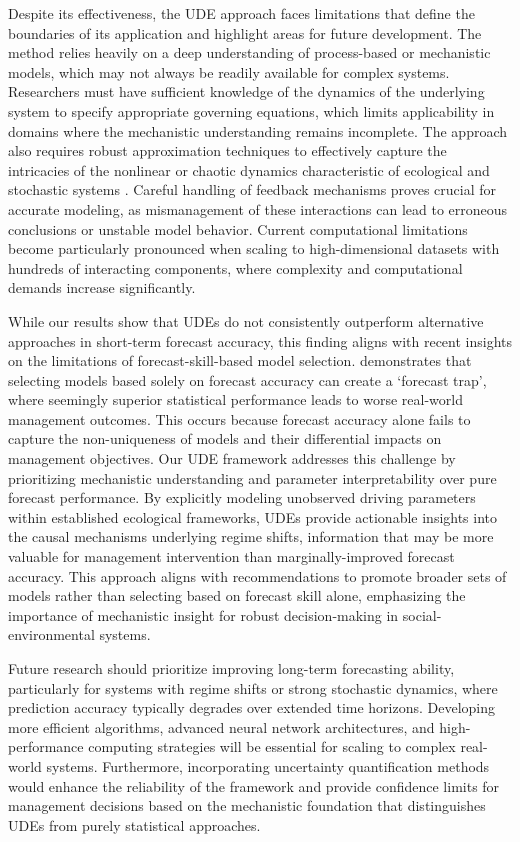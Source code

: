 \documentclass[openacc]{rsproca_new}%
\begin{document}
Despite its effectiveness, the UDE approach faces limitations that define the boundaries of its application and highlight areas for future development. The method relies heavily on a deep understanding of process-based or mechanistic models, which may not always be readily available for complex systems. Researchers must have sufficient knowledge of the dynamics of the underlying system to specify appropriate governing equations, which limits applicability in domains where the mechanistic understanding remains incomplete. The approach also requires robust approximation techniques to effectively capture the intricacies of the nonlinear or chaotic dynamics characteristic of ecological and stochastic systems \cite{jack_statespace}. Careful handling of feedback mechanisms proves crucial for accurate modeling, as mismanagement of these interactions can lead to erroneous conclusions or unstable model behavior. Current computational limitations become particularly pronounced when scaling to high-dimensional datasets with hundreds of interacting components, where complexity and computational demands increase significantly.

While our results show that UDEs do not consistently outperform alternative approaches in short-term forecast accuracy, this finding aligns with recent insights on the limitations of forecast-skill-based model selection. \textcite{boettiger2022forecast} demonstrates that selecting models based solely on forecast accuracy can create a `forecast trap', where seemingly superior statistical performance leads to worse real-world management outcomes. This occurs because forecast accuracy alone fails to capture the non-uniqueness of models and their differential impacts on management objectives. Our UDE framework addresses this challenge by prioritizing mechanistic understanding and parameter interpretability over pure forecast performance. By explicitly modeling unobserved driving parameters within established ecological frameworks, UDEs provide actionable insights into the causal mechanisms underlying regime shifts, information that may be more valuable for management intervention than marginally-improved forecast accuracy. This approach aligns with recommendations to promote broader sets of models rather than selecting based on forecast skill alone, emphasizing the importance of mechanistic insight for robust decision-making in social-environmental systems.

Future research should prioritize improving long-term forecasting ability, particularly for systems with regime shifts or strong stochastic dynamics, where prediction accuracy typically degrades over extended time horizons. Developing more efficient algorithms, advanced neural network architectures, and high-performance computing strategies will be essential for scaling to complex real-world systems. Furthermore, incorporating uncertainty quantification methods would enhance the reliability of the framework and provide confidence limits for management decisions based on the mechanistic foundation that distinguishes UDEs from purely statistical approaches.
\end{document}
